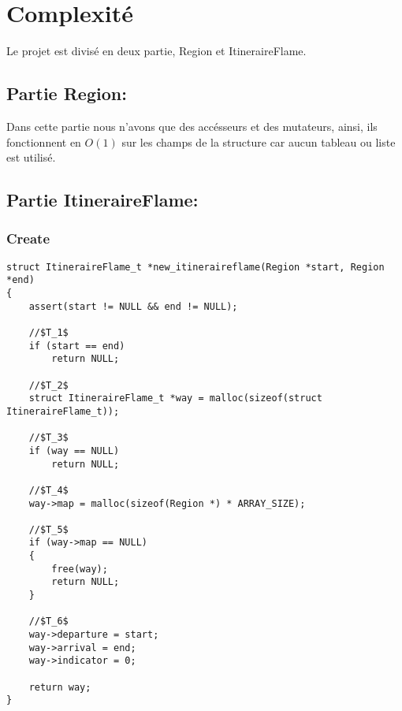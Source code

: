 \section{Complexité}\label{complexite}

\quad Le projet est divisé en deux partie, Region et ItineraireFlame.

\subsection{Partie Region:}

Dans cette partie nous n'avons que des accésseurs et des mutateurs, ainsi, ils fonctionnent
en $O(1)$ sur les champs de la structure car aucun tableau ou liste est utilisé.

\subsection{Partie ItineraireFlame:}

\subsubsection{Create}

\begin{lstlisting}
struct ItineraireFlame_t *new_itineraireflame(Region *start, Region *end)
{
    assert(start != NULL && end != NULL);

    //$T_1$
    if (start == end)
        return NULL;

    //$T_2$
    struct ItineraireFlame_t *way = malloc(sizeof(struct ItineraireFlame_t));

    //$T_3$
    if (way == NULL)
        return NULL;

    //$T_4$
    way->map = malloc(sizeof(Region *) * ARRAY_SIZE);

    //$T_5$
    if (way->map == NULL)
    {
        free(way);
        return NULL;
    }

    //$T_6$
    way->departure = start;
    way->arrival = end;
    way->indicator = 0;
    
    return way;
}
\end{lstlisting}

